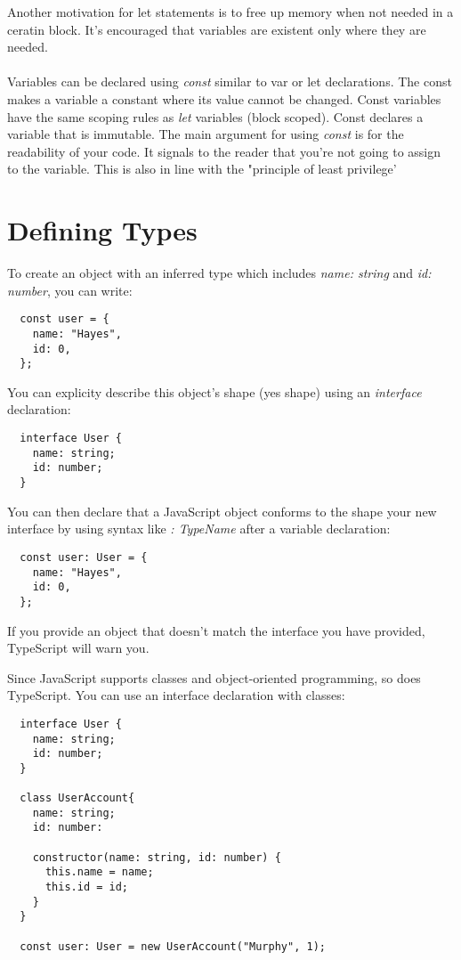 \documentclass{article}%
\begin{document}
Another motivation for let statements is to free up memory when not needed in a ceratin block. It's encouraged
that variables are existent only where they are needed. \\ \\

Variables can be declared using \textit{const} similar to var or let declarations. The const makes a variable a constant where its value cannot be changed.
Const variables have the same scoping rules as \textit{let} variables (block scoped). Const declares a variable that is immutable. The main argument for using
\textit{const} is for the readability of your code. It signals to the reader that you're not going to assign to the variable. This is also in line with the "principle
of least privilege'

\section{Defining Types}
To create an object with an inferred type which includes \textit{name: string} and
\textit{id: number}, you can write:
\begin{lstlisting}
  const user = {
    name: "Hayes",
    id: 0,
  };
\end{lstlisting}
You can explicity describe this object's shape (yes shape) using an \textit{interface} declaration:
\begin{lstlisting}
  interface User {
    name: string;
    id: number;
  }
\end{lstlisting}
You can then declare that a JavaScript object conforms to the shape your new interface by using syntax like \textit{: TypeName} after a variable declaration:
\begin{lstlisting}
  const user: User = {
    name: "Hayes",
    id: 0,
  };
\end{lstlisting}
If you provide an object that doesn't match the interface you have provided, 
TypeScript will warn you.

Since JavaScript supports classes and object-oriented programming, so does TypeScript. You can use an interface declaration with classes:
\begin{lstlisting}
  interface User {
    name: string;
    id: number;
  }

  class UserAccount{
    name: string;
    id: number:

    constructor(name: string, id: number) {
      this.name = name;
      this.id = id;
    }
  }

  const user: User = new UserAccount("Murphy", 1);
\end{lstlisting}
\end{document}
